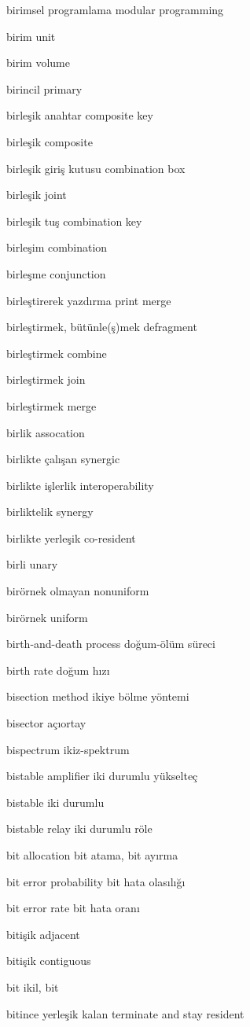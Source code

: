 \documentclass[12pt,fleqn]{article}\usepackage{../../common}
\begin{document}
birimsel programlama modular programming

birim unit

birim volume

birincil primary

birleşik anahtar composite key

birleşik composite

birleşik giriş kutusu combination box

birleşik joint

birleşik tuş combination key

birleşim combination

birleşme conjunction

birleştirerek yazdırma print merge

birleştirmek, bütünle(ş)mek defragment

birleştirmek combine

birleştirmek join

birleştirmek merge

birlik assocation

birlikte çalışan synergic

birlikte işlerlik interoperability

birliktelik synergy

birlikte yerleşik co-resident

birli unary

birörnek olmayan nonuniform

birörnek uniform

birth-and-death process doğum-ölüm süreci

birth rate doğum hızı

bisection method ikiye bölme yöntemi

bisector açıortay

bispectrum ikiz-spektrum

bistable amplifier iki durumlu yükselteç

bistable iki durumlu

bistable relay iki durumlu röle

bit allocation bit atama, bit ayırma

bit error probability bit hata olasılığı

bit error rate bit hata oranı

bitişik adjacent

bitişik contiguous

bit ikil, bit

bitince yerleşik kalan terminate and stay resident
\end{document}
